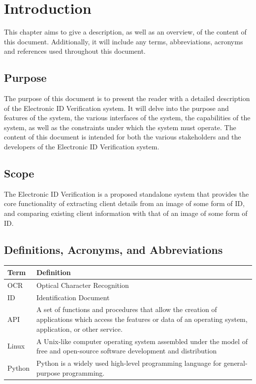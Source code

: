 \documentclass{article}
\def \project{Electronic ID Verification }
\begin{document}
\cleardoublepage
\thispagestyle{empty}
\tableofcontents
\newpage

\setcounter{page}{1}
	\section{Introduction}\label{sec:intro}
		This chapter aims to give a description, as well as an overview, of the content of this document. Additionally, it will include any terms, abbreviations, acronyms and references used throughout this document.

		\subsection{Purpose}\label{subsec:purpose}
			The purpose of this document is to present the reader with a detailed description of the \project system. It will delve into the purpose and features of the system, the various interfaces of the system, the capabilities of the system, as well as the constraints under which the system must operate. The content of this document is intended for both the various stakeholders and the developers of the \project system.

		\subsection{Scope}\label{subsec:scope}
			The \project is a proposed standalone system that provides the core functionality of extracting client details from an image of some form of ID, and comparing existing client information with that of an image of some form of ID.

		\subsection{Definitions, Acronyms, and Abbreviations}\label{subsec:daa}
			\begin{table}[h!]
				\centering
				\label{tab: Table 1}
				\begin{tabular}{| m{4cm} | m{12cm} |}
					\hline
                        \textbf{Term} & \textbf{Definition}\\
					\hline
				    	OCR & Optical Character Recognition\\
				    \hline
			            ID & Identification Document\\
					
				    \hline
				        API & A set of functions and procedures that allow the creation of applications which access the features or data of an operating system, application, or other service. \\
				    \hline
				        Linux &  A Unix-like computer operating system assembled under the model of free and open-source software development and distribution\\
					\hline
					    Python & Python is a widely used high-level programming language for general-purpose programming.\\
					\hline
                    
				\end{tabular}
			\end{table}
		    
\end{document}
